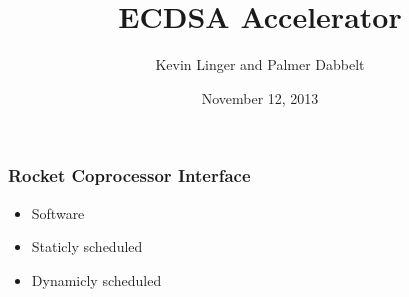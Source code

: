 \documentclass{beamer}
\title{ECDSA Accelerator}
\author{Kevin Linger and Palmer Dabbelt}
\date{November 12, 2013}
\begin{document}
\maketitle

\begin{frame}
  \frametitle{Rocket Coprocessor Interface}

  \begin{multicols}{2}
    \begin{center}
      
    \end{center}

    \setcounter{beamerpauses}{3}
    \begin{itemize}
      \item Software
      \item Staticly scheduled
      \item Dynamicly scheduled
    \end{itemize}
  \end{multicols}

\end{frame}
\end{document}
